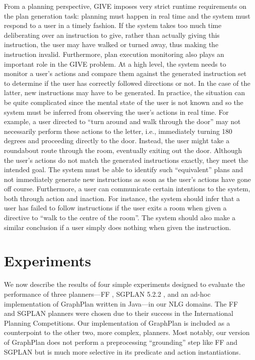 \documentclass[letterpaper]{article}
\begin{document}
From a planning perspective, GIVE imposes very strict runtime
requirements on the plan generation task: planning must
happen in real time and the system must respond to a user in a timely
fashion.  If the system takes too much time deliberating over an
instruction to give, rather than actually giving this instruction, the
user may have walked or turned away, thus making the instruction
invalid.  Furthermore, plan execution monitoring also plays an
important role in the GIVE problem.  At a high level, the system needs
to monitor a user's actions and compare them against the generated
instruction set to determine if the user has correctly followed
directions or not. In the case of the latter, new instructions may
have to be generated. In practice, the situation can be quite
complicated since the mental state of the user is not known and so the
system must be inferred from observing the user's actions in real
time. For example, a user directed to ``turn around and walk through
the door'' may not necessarily perform these actions to the letter,
i.e., immediately turning 180 degrees and proceeding directly to the
door. Instead, the user might take a roundabout route through the
room, eventually exiting out the door.  Although the user's actions do
not match the generated instructions exactly, they meet the intended
goal. The system must be able to identify such ``equivalent'' plans
and not immediately generate new instructions as soon as the user's
actions have gone off course. Furthermore, a user can communicate
certain intentions to the system, both through action and
inaction. For instance, the system should infer that a user has failed
to follow instructions if the user exits a room when given a directive
to ``walk to the centre of the room''. The system should also make a
similar conclusion if a user simply does nothing when given the
instruction.


\section{Experiments}
\label{sec:experiments}

We now describe the results of four simple experiments designed to evaluate
the performance of three planners---FF \citep{HoffmannNebel01}, SGPLAN
5.2.2 \citep{hsu06:_new_featur_in_sgplan_for}, and an ad-hoc implementation
of GraphPlan \citep{Blum1997} written in Java---in our NLG domains. The FF
and SGPLAN planners were chosen due to their success in the International
Planning Competitions. Our implementation of GraphPlan is included as a
counterpoint to the other two, more complex, planners. Most notably, our
version of GraphPlan does not perform a preprocessing ``grounding'' step
like FF and SGPLAN but is much more selective in its predicate and action
instantiations.
\end{document}

